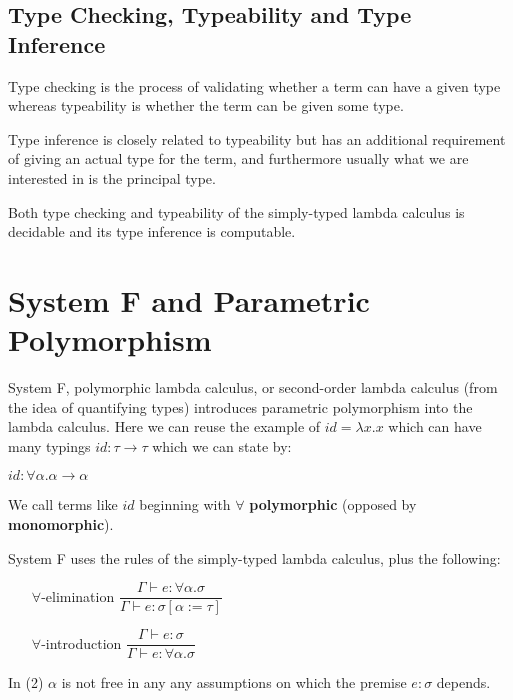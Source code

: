 
\subsection{Type Checking, Typeability and Type Inference}

Type checking is the process of validating whether a term can have a given type
whereas typeability is whether the term can be given some type.

Type inference is closely related to typeability but has an additional requirement of giving an actual type for the term, and furthermore
usually what we are interested in is the principal type.

Both type checking and typeability of the simply-typed lambda calculus is decidable and its type inference is computable. %

\section{System F and Parametric Polymorphism} %

System F, polymorphic lambda calculus, or second-order lambda calculus (from the idea of quantifying types) introduces
parametric polymorphism into the lambda calculus. Here we can reuse the example of $id = \lambda x . x$ which can have many typings
$id : \tau \rightarrow \tau$ which we can state by:

$id : \forall \alpha . \alpha \rightarrow \alpha$

We call terms like $id$ beginning with $\forall$ \textbf{polymorphic} (opposed by \textbf{monomorphic}).

System F uses the rules of the simply-typed lambda calculus, plus the following:

\begin{itemize}
    \item[$\forall$-elimination] $\dfrac{\Gamma \vdash e : \forall \alpha . \sigma}{\Gamma \vdash e : \sigma [\alpha := \tau]}$
    \item[$\forall$-introduction] $\dfrac{\Gamma \vdash e : \sigma}{\Gamma \vdash e : \forall \alpha . \sigma}$
\end{itemize}

In (2) $\alpha$ is not free in any any assumptions on which the premise $e : \sigma$ depends. %

